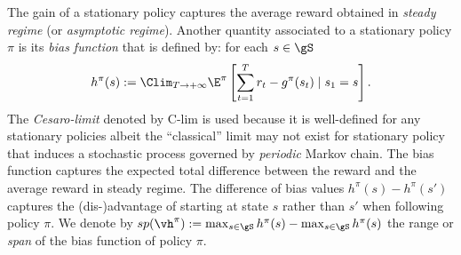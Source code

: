 The gain of a stationary policy captures the average reward obtained in \emph{steady regime} (or \emph{asymptotic regime}).
Another quantity associated to a stationary policy $\pi$ is its \emph{bias function} that is defined by: for each $s\in\gS$
\begin{equation}
    \label{eq:bias_defn}
    h^\pi(s) :=\Clim_{T\to+\infty} \E^\pi\left[ \sum_{t=1}^{T} r_t -g^\pi(s_t) \mid s_1=s\right].
\end{equation}
The \emph{Cesaro-limit} denoted by $\mathrm{C}$-$\mathrm{lim}$ is used because it is well-defined for any stationary policies albeit the ``classical'' limit may not exist for stationary policy that induces a stochastic process governed by \emph{periodic} Markov chain.
The bias function captures the expected total difference between the reward and the average reward in steady regime. 
The difference of bias values $h^\pi(s)-h^\pi(s')$ captures the (dis-)advantage of starting at state $s$ rather than $s'$ when following policy $\pi$.
We denote by $sp(\vh^\pi):=\max_{s\in\gS}h^\pi(s) -\max_{s\in\gS}h^\pi(s)$ the range or \emph{span} of the bias function of policy $\pi$.

